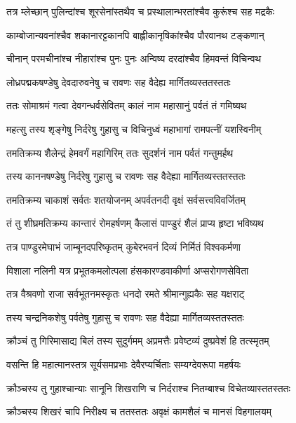 \twolineshloka
{तत्र म्लेच्छान् पुलिन्दांश्च शूरसेनांस्तथैव च}
{प्रस्थालान्भरतांश्चैव कुरूंश्च सह मद्रकैः} %

\twolineshloka
{काम्बोजान्यवनांश्चैव शकानारट्टकानपि}
{बाह्लीकानृषिकांश्चैव पौरवानथ टङ्कणान्} %

\twolineshloka
{चीनान् परमचीनांश्च नीहारांश्च पुनः पुनः}
{अन्विष्य दरदांश्चैव हिमवन्तं विचिन्वथ} %

\twolineshloka
{लोध्रपद्मकषण्डेषु देवदारुवनेषु च}
{रावणः सह वैदेह्य मार्गितव्यस्ततस्ततः} %

\twolineshloka
{ततः सोमाश्रमं गत्वा देवगन्धर्वसेवितम्}
{कालं नाम महासानुं पर्वतं तं गमिष्यथ} %

\twolineshloka
{महत्सु तस्य शृङ्गेषु निर्दरेषु गुहासु च}
{विचिनुध्वं महाभागां रामपत्नीं यशस्विनीम्} %

\twolineshloka
{तमतिक्रम्य शैलेन्द्रं हेमवर्गं महागिरिम्}
{ततः सुदर्शनं नाम पर्वतं गन्तुमर्हथ} %

\twolineshloka
{तस्य काननषण्डेषु निर्दरेषु गुहासु च}
{रावणः सह वैदेह्या मार्गितव्यस्ततस्ततः} %

\twolineshloka
{तमतिक्रम्य चाकाशं सर्वतः शतयोजनम्}
{अपर्वतनदी वृक्षं सर्वसत्त्वविवर्जितम्} %

\twolineshloka
{तं तु शीघ्रमतिक्रम्य कान्तारं रोमहर्षणम्}
{कैलासं पाण्डुरं शैलं प्राप्य हृष्टा भविष्यथ} %

\twolineshloka
{तत्र पाण्डुरमेघाभं जाम्बूनदपरिष्कृतम्}
{कुबेरभवनं दिव्यं निर्मितं विश्वकर्मणा} %

\twolineshloka
{विशाला नलिनी यत्र प्रभूतकमलोत्पला}
{हंसकारण्डवाकीर्णा अप्सरोगणसेविता} %

\twolineshloka
{तत्र वैश्रवणो राजा सर्वभूतनमस्कृतः}
{धनदो रमते श्रीमान्गुह्यकैः सह यक्षराट्} %

\twolineshloka
{तस्य चन्द्रनिकशेषु पर्वतेषु गुहासु च}
{रावणः सह वैदेह्या मार्गितव्यस्ततस्ततः} %

\twolineshloka
{क्रौञ्चं तु गिरिमासाद्य बिलं तस्य सुदुर्गमम्}
{अप्रमत्तैः प्रवेष्टव्यं दुष्प्रवेशं हि तत्स्मृतम्} %

\twolineshloka
{वसन्ति हि महात्मानस्तत्र सूर्यसमप्रभाः}
{देवैरप्यर्चिताः सम्यग्देवरूपा महर्षयः} %

\twolineshloka
{क्रौञ्चस्य तु गुहाश्चान्याः सानूनि शिखराणि च}
{निर्दराश्च नितम्बाश्च विचेतव्यास्ततस्ततः} %

\twolineshloka
{क्रौञ्चस्य शिखरं चापि निरीक्ष्य च ततस्ततः}
{अवृक्षं कामशैलं च मानसं विहगालयम्} %

